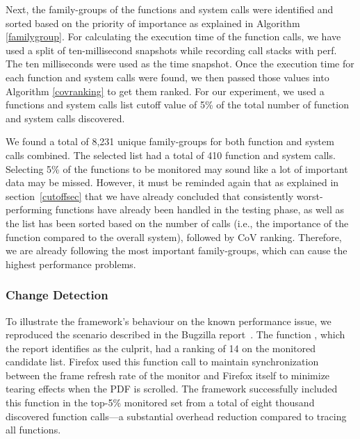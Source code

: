 \documentclass[pdflatex,sn-nature]{sn-jnl}%
\theoremstyle{thmstyleone}%
\theoremstyle{thmstyletwo}%
\theoremstyle{thmstylethree}%
\begin{document}
Next, the family-groups of the functions and system calls were identified and sorted based on the priority of importance as explained in Algorithm \ref{familygroup}. For calculating the execution time of the function calls, we have used a split of ten-millisecond snapshots while recording call stacks with perf. The ten milliseconds were used as the time snapshot. Once the execution time for each function and system calls were found, we then passed those values into Algorithm \ref{covranking} to get them ranked. For our experiment, we used a functions and system calls list cutoff value of 5\% of the total number of function and system calls discovered.

We found a total of 8,231 unique family-groups for both function and system calls combined. The selected list had a total of 410 function and system calls. Selecting 5\% of the functions to be monitored may sound like a lot of important data may be missed. However, it must be reminded again that as explained in section~\ref{cutoffsec} that we have already concluded that consistently worst-performing functions have already been handled in the testing phase, as well as the list has been sorted based on the number of calls (i.e., the importance of the function compared to the overall system), followed by CoV ranking. Therefore, we are already following the most important family-groups, which can cause the highest performance problems.


\subsubsection{Change Detection}\label{case studies & evaluation: change detection case study 2}

To illustrate the framework's behaviour on the known performance issue, we reproduced the scenario described in the Bugzilla report~\cite{clessili-2022}. The function , which the report identifies as the culprit, had a ranking of 14 on the monitored candidate list. Firefox used this function call to maintain synchronization between the frame refresh rate of the monitor and Firefox itself to minimize tearing effects when the PDF is scrolled. The framework successfully included this function in the top-5\% monitored set from a total of eight thousand discovered function calls---a substantial overhead reduction compared to tracing all functions.
\end{document}
